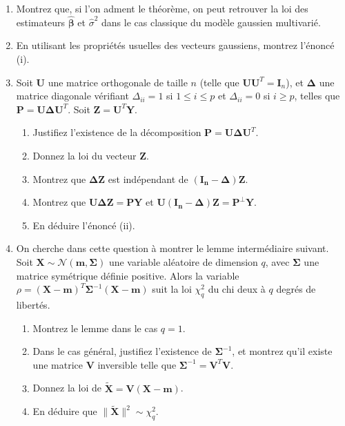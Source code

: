 \documentclass{../headers/td_upc}
\providecommand{\1}{\mathds{1}}
\begin{document}
	\begin{enumerate}
		\item Montrez que, si l'on adment le théorème, on peut retrouver la loi des
		estimateurs $\hat{\boldsymbol{\beta}}$ et $\hat{\sigma}^2$ dans le cas classique
		du modèle gaussien multivarié.
		\item En utilisant les propriétés usuelles des vecteurs gaussiens, montrez l'énoncé (i).
		\item Soit $\mathbf{U}$ une matrice orthogonale de taille $n$ 
		(telle que $\mathbf{U}\mathbf{U}^T = \mathbf{I}_n$), 
		et $\mathbf{\Delta}$ une matrice diagonale vérifiant $\Delta_{ii} = 1$ si $1 \leq i \leq p$
		et $\Delta_{ii} = 0$ si $i \geq p$, telles que $\mathbf{P} = \mathbf{U}\mathbf{\Delta}\mathbf{U}^T$.
		Soit $\mathbf{Z} = \mathbf{U}^T\mathbf{Y}$. 
		\begin{enumerate}
		\item Justifiez l'existence de la décomposition $\mathbf{P} = \mathbf{U}\mathbf{\Delta}\mathbf{U}^T$.
		\item Donnez la loi du vecteur $\mathbf{Z}$.
		\item Montrez que $\mathbf{\Delta}\mathbf{Z}$ est indépendant de $(\mathbf{I_n} - \mathbf{\Delta})\mathbf{Z}$.
		\item Montrez que $\mathbf{U}\mathbf{\Delta}\mathbf{Z} = \mathbf{P} \mathbf{Y}$ 
		et $\mathbf{U}(\mathbf{I_n} - \mathbf{\Delta})\mathbf{Z} = \mathbf{P}^{\bot} \mathbf{Y}$.
		\item En déduire l'énoncé (ii).
		\end{enumerate}
		\item On cherche dans cette question à montrer le lemme intermédiaire suivant.
		Soit $\mathbf{X} \sim \mathcal{N}(\mathbf{m}, \mathbf{\Sigma})$
		une variable aléatoire de dimension $q$, avec $\mathbf{\Sigma}$ une matrice symétrique
		définie positive. Alors la variable $\rho = (\mathbf{X} - \mathbf{m})^T \mathbf{\Sigma}^{-1}(\mathbf{X} - \mathbf{m})$
		suit la loi $\chi^2_q$ du chi deux à $q$ degrés de libertés.
		\begin{enumerate}
		\item Montrez le lemme dans le cas $q = 1$.
		\item Dans le cas général, justifiez l'existence de $\mathbf{\Sigma}^{-1}$,
		et montrez qu'il existe une matrice $\mathbf{V}$ inversible telle 
		que $\mathbf{\Sigma}^{-1} = \mathbf{V}^T\mathbf{V}$.
		\item Donnez la loi de $\tilde{\mathbf{X}} = \mathbf{V}(\mathbf{X} - \mathbf{m})$.
		\item En déduire que $\|\tilde{\mathbf{X}}\|^2 \sim \chi^2_q$.

\end{enumerate}
\end{enumerate}
\end{document}
